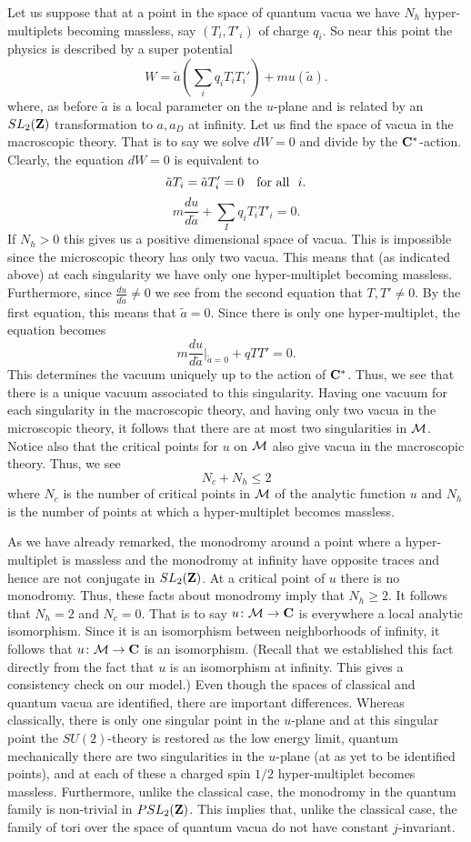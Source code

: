 \documentclass[10pt]{article}
\begin{document}
Let us suppose that at a point in the space of quantum vacua we have
$N_h$ hyper-multiplets becoming 
massless, say $(T_i,T'_i)$ of charge $q_i$.
So near this point the physics is described by a super potential
$$W=\tilde a\left(\sum_iq_iT_iT_i'\right) +mu(\tilde a).$$
where, as before $\tilde a$ is a local parameter on the $u$-plane and
is related by an $SL_2({\bf Z})$ transformation to $a,a_D$ at
infinity. 
Let us find the space of  vacua in the macroscopic theory.  That is to
say we solve $dW=0$ and divide by the ${\bf C}^*$-action.  Clearly,
the equation $dW=0$  is equivalent to
$$\tilde aT_i=\tilde aT_i'=0\ \ \ {\rm  for\  all\ \ }i.$$
$$m\frac{du}{d\tilde a}+\sum_Iq_iT_iT'_i=0.$$
If $N_h>0$ this gives us a positive dimensional space of vacua. This
is impossible since the microscopic theory has only two vacua.
This means that (as indicated above) at each singularity we have only
one hyper-multiplet 
becoming massless.
Furthermore, since $\frac{du}{d\tilde a}\not= 0$ we see
from the second equation that $T,T'\not=0$.  By the first equation,
this means that $\tilde a=0$.
Since there is only one hyper-multiplet, the equation becomes
$$m\frac{du}{d\tilde a}|_{\tilde a=0}
+qTT'=0.$$
This determines the vacuum uniquely up to the action of ${\bf
C}^*$. Thus, we see that there is a unique vacuum associated to this
singularity. 
Having one vacuum for each singularity
in the macroscopic theory, and having only two vacua in the
microscopic theory, it follows that there are at most two
singularities in ${\cal M}$. Notice also that the critical points for
$u$ on ${\cal M}$ also give vacua in the macroscopic theory.  Thus, we see
$$N_c+N_h\le 2$$
where $N_c$ is the number of critical points in ${\cal M}$ of the
analytic function $u$ and $N_h$ is the number of points at which a
hyper-multiplet becomes massless.


As we have already remarked, the monodromy around a point where a
hyper-multiplet is massless and the monodromy at infinity have opposite
traces and hence are not conjugate in $SL_2({\bf Z})$.
At a critical point of $u$ there is no monodromy.
Thus, these facts about monodromy imply that  $N_h\ge 2$. 
It follows that $N_h=2$ and $N_c=0$. That is to say $u\colon {\cal
M}\to {\bf C}$ is everywhere a local analytic isomorphism.  Since it
is an isomorphism between neighborhoods of infinity, it follows that
$u\colon {\cal M}\to {\bf C}$ is an isomorphism.
(Recall that we established this fact directly from the fact that $u$
is an isomorphism at infinity. This gives a consistency check on our
model.) 
Even though the spaces of classical and quantum vacua are identified,
there are important differences.
Whereas classically, there is only one singular point in the $u$-plane
and at this singular point the $SU(2)$-theory is restored as the low
energy limit, quantum
mechanically there are 
two singularities in the $u$-plane (at as yet to be identified
points), and at each of these a charged 
spin $1/2$ hyper-multiplet  becomes massless. Furthermore, unlike the
classical case, the monodromy in the quantum family is non-trivial in
$PSL_2({\bf Z})$.  This implies that, unlike the classical case, the
family of tori over the 
space of quantum vacua do not have constant $j$-invariant.
\end{document}
